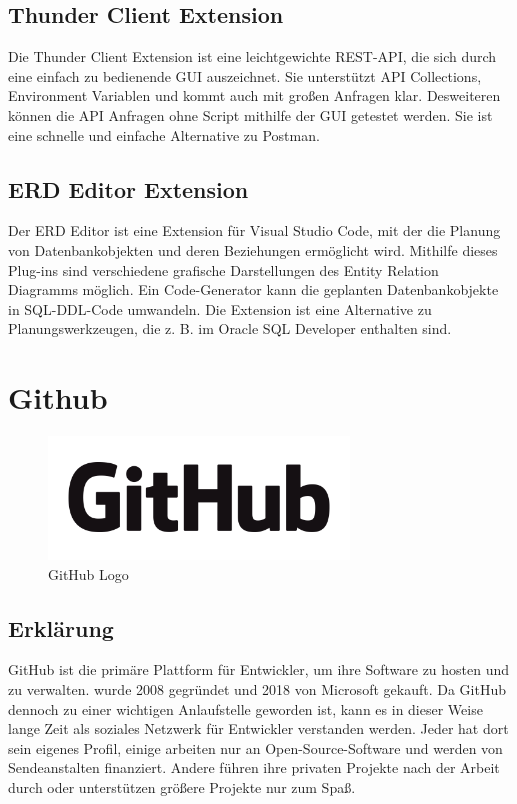 \subsection{Thunder Client Extension}
\cite{ThunderClientRangav}

Die Thunder Client Extension ist eine leichtgewichte REST-API, die sich durch eine einfach zu bedienende GUI auszeichnet.
Sie unterstützt API Collections, Environment Variablen und kommt auch mit großen Anfragen klar. Desweiteren können die API Anfragen 
ohne Script mithilfe der GUI getestet werden. Sie ist eine schnelle und einfache Alternative zu Postman.

\subsection{ERD Editor Extension}
\cite{ErdEditor}

Der ERD Editor ist eine Extension für Visual Studio Code, mit der die Planung von Datenbankobjekten und deren 
Beziehungen ermöglicht wird. Mithilfe dieses Plug-ins sind verschiedene grafische Darstellungen des Entity Relation Diagramms möglich.
Ein Code-Generator kann die geplanten Datenbankobjekte in SQL-DDL-Code umwandeln. Die Extension ist eine Alternative zu Planungswerkzeugen, 
die z. B. im Oracle SQL Developer enthalten sind.
\newpage

\section{Github}
\cite{GitHub}
\begin{figure}[h]
    \begin{center}
        \includegraphics*[width=8cm]{pics/GitHub_Logo.png}
        \caption[GitHub Logo]{GitHub Logo \cite{GithubLogo}}
    \end{center}
\end{figure}
\subsection*{Erklärung}
GitHub ist die primäre Plattform für Entwickler, um ihre Software zu hosten 
und zu verwalten. wurde 2008 gegründet und 2018 von Microsoft gekauft. 
Da GitHub dennoch zu einer wichtigen Anlaufstelle geworden ist, 
kann es in dieser Weise lange Zeit als soziales Netzwerk für Entwickler 
verstanden werden. Jeder hat dort sein eigenes Profil, einige arbeiten 
nur an Open-Source-Software und werden von Sendeanstalten finanziert. 
Andere führen ihre privaten Projekte nach der Arbeit durch oder unterstützen 
größere Projekte nur zum Spaß.
